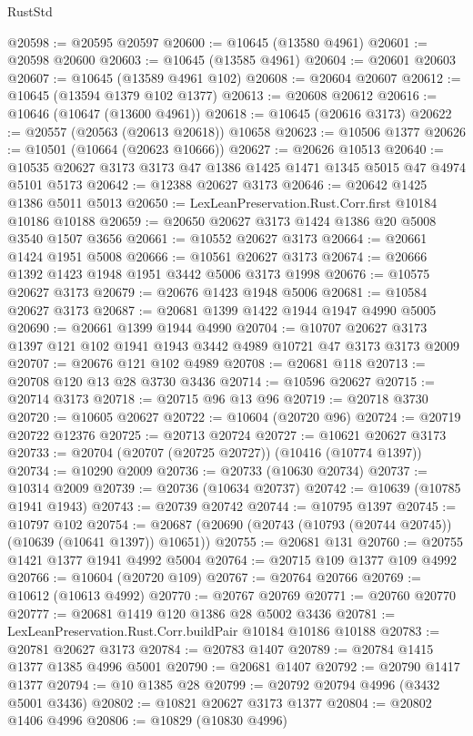 \begin{lexlean}{RustStd}
\begin{coremodule}
@20598 := @20595 @20597
@20600 := @10645 (@13580 @4961)
@20601 := @20598 @20600
@20603 := @10645 (@13585 @4961)
@20604 := @20601 @20603
@20607 := @10645 (@13589 @4961 @102)
@20608 := @20604 @20607
@20612 := @10645 (@13594 @1379 @102 @1377)
@20613 := @20608 @20612
@20616 := @10646 (@10647 (@13600 @4961))
@20618 := @10645 (@20616 @3173)
@20622 := @20557 (@20563 (@20613 @20618)) @10658
@20623 := @10506 @1377
@20626 := @10501 (@10664 (@20623 @10666))
@20627 := @20626 @10513
@20640 := @10535 @20627 @3173 @3173 @47 @1386 @1425 @1471 @1345 @5015 @47 @4974 @5101 @5173
@20642 := @12388 @20627 @3173
@20646 := @20642 @1425 @1386 @5011 @5013
@20650 := LexLeanPreservation.Rust.Corr.first @10184 @10186 @10188
@20659 := @20650 @20627 @3173 @1424 @1386 @20 @5008 @3540 @1507 @3656
@20661 := @10552 @20627 @3173
@20664 := @20661 @1424 @1951 @5008
@20666 := @10561 @20627 @3173
@20674 := @20666 @1392 @1423 @1948 @1951 @3442 @5006 @3173 @1998
@20676 := @10575 @20627 @3173
@20679 := @20676 @1423 @1948 @5006
@20681 := @10584 @20627 @3173
@20687 := @20681 @1399 @1422 @1944 @1947 @4990 @5005
@20690 := @20661 @1399 @1944 @4990
@20704 := @10707 @20627 @3173 @1397 @121 @102 @1941 @1943 @3442 @4989 @10721 @47 @3173 @3173 @2009
@20707 := @20676 @121 @102 @4989
@20708 := @20681 @118
@20713 := @20708 @120 @13 @28 @3730 @3436
@20714 := @10596 @20627
@20715 := @20714 @3173
@20718 := @20715 @96 @13 @96
@20719 := @20718 @3730
@20720 := @10605 @20627
@20722 := @10604 (@20720 @96)
@20724 := @20719 @20722 @12376
@20725 := @20713 @20724
@20727 := @10621 @20627 @3173
@20733 := @20704 (@20707 (@20725 @20727)) (@10416 (@10774 @1397))
@20734 := @10290 @2009
@20736 := @20733 (@10630 @20734)
@20737 := @10314 @2009
@20739 := @20736 (@10634 @20737)
@20742 := @10639 (@10785 @1941 @1943)
@20743 := @20739 @20742
@20744 := @10795 @1397
@20745 := @10797 @102
@20754 := @20687 (@20690 (@20743 (@10793 (@20744 @20745)) (@10639 (@10641 @1397)) @10651))
@20755 := @20681 @131
@20760 := @20755 @1421 @1377 @1941 @4992 @5004
@20764 := @20715 @109 @1377 @109 @4992
@20766 := @10604 (@20720 @109)
@20767 := @20764 @20766
@20769 := @10612 (@10613 @4992)
@20770 := @20767 @20769
@20771 := @20760 @20770
@20777 := @20681 @1419 @120 @1386 @28 @5002 @3436
@20781 := LexLeanPreservation.Rust.Corr.buildPair @10184 @10186 @10188
@20783 := @20781 @20627 @3173
@20784 := @20783 @1407
@20789 := @20784 @1415 @1377 @1385 @4996 @5001
@20790 := @20681 @1407
@20792 := @20790 @1417 @1377
@20794 := @10 @1385 @28
@20799 := @20792 @20794 @4996 (@3432 @5001 @3436)
@20802 := @10821 @20627 @3173 @1377
@20804 := @20802 @1406 @4996
@20806 := @10829 (@10830 @4996)

\end{coremodule}
\end{lexlean}
